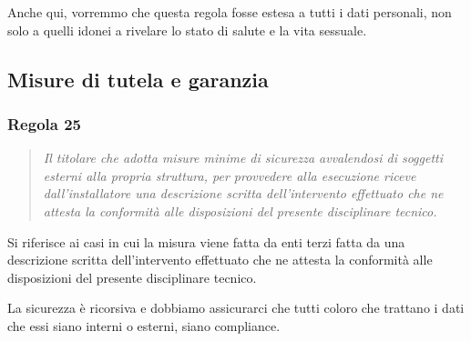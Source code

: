 Anche qui, vorremmo che questa regola fosse estesa a tutti i dati personali, non solo a quelli idonei a rivelare lo stato di salute e la vita sessuale.
\subsection{Misure di tutela e garanzia}
\subsubsection*{Regola 25}
\begin{quote}
    \textit{Il titolare che adotta misure minime di sicurezza avvalendosi di soggetti esterni alla propria struttura, per provvedere alla esecuzione riceve dall'installatore una descrizione scritta dell'intervento effettuato che ne attesta la conformità alle disposizioni del presente disciplinare tecnico.}
\end{quote}

Si riferisce ai casi in cui la misura viene fatta da enti terzi fatta da una descrizione scritta dell'intervento effettuato che ne attesta la conformità alle disposizioni del presente disciplinare tecnico.

La sicurezza è ricorsiva e dobbiamo assicurarci che tutti coloro che trattano i dati che essi siano interni o esterni, siano compliance. 

